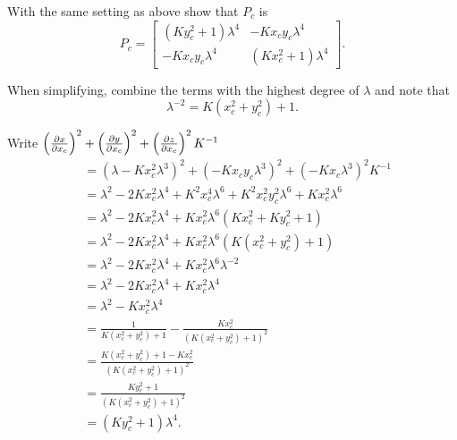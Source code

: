 \documentclass{ximera}
\begin{document}
\begin{problem}
With the same setting as above show that $P_c$ is
  \[
  P_c =
  \begin{bmatrix}
    \left(Ky_c^2+1\right)\lambda^4 & -Kx_{c}y_{c}\lambda^4\\
    -Kx_{c}y_{c}\lambda^4 & \left(Kx_c^2+1\right)\lambda^4
  \end{bmatrix}.
\]

\begin{hint}
  When simplifying, combine the terms with the highest degree of $\lambda$
  and note that
  \[
  \lambda^{-2} = K\left(x_c^2 + y_c^2\right) + 1.
  \]
\end{hint}
\begin{freeResponse}
  
  Write $\left(\pp[x]{x_c}\right)^2 + \left(\pp[y]{x_c}\right)^2 +\left(\pp[z]{x_c}\right)^2K^{-1}$
    \begin{align*}
      &= \left(\lambda -Kx_c^2 \lambda^3\right)^2 + \left(-Kx_cy_c \lambda^3\right)^2 + \left(-Kx_c \lambda^3\right)^2K^{-1}\\
      &= \lambda^2 - 2Kx_c^2\lambda^4 + K^2x_c^4 \lambda^6+ K^2x_c^2y_c^2\lambda^6 + Kx_c^2\lambda^6\\
      &= \lambda^2 - 2Kx_c^2\lambda^4 + Kx_c^2\lambda^6\left(Kx_c^2 + Ky_c^2 + 1\right)\\
      &= \lambda^2 - 2Kx_c^2\lambda^4 + Kx_c^2\lambda^6\left(K\left(x_c^2 + y_c^2\right) + 1\right)\\
      &= \lambda^2 - 2Kx_c^2\lambda^4 + Kx_c^2\lambda^6 \lambda^{-2}\\
      &= \lambda^2 - 2Kx_c^2\lambda^4 + Kx_c^2\lambda^4\\
      &= \lambda^2 - Kx_c^2\lambda^4\\
      &= \frac{1}{K\left(x_c^2+y_c^2\right)+1} - \frac{Kx_c^2}{\left(K\left(x_c^2+y_c^2\right)+1\right)^2}\\
      &= \frac{K\left(x_c^2 + y_c^2\right) +1 - Kx_c^2}{\left(K\left(x_c^2+y_c^2\right)+1\right)^2}\\
      &= \frac{Ky_c^2+1}{\left(K\left(x_c^2+y_c^2\right)+1\right)^2}\\
      &= \left(Ky_c^2+1\right)\lambda^4.
    \end{align*}
    

\end{freeResponse}
\end{problem}
\end{document}
